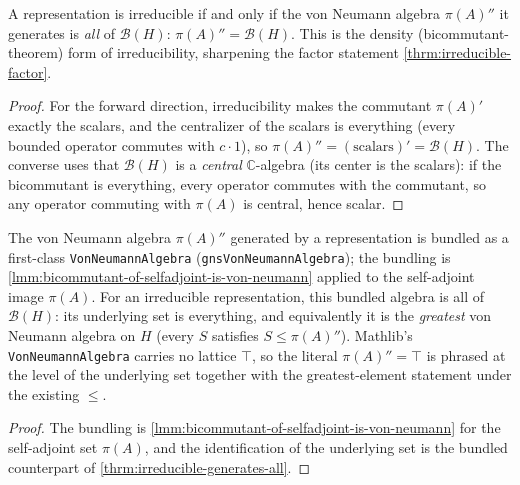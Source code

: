 \begin{theorem}
    \label{thrm:irreducible-generates-all}
    \leanok
    A representation is irreducible if and only if the von Neumann algebra $\pi(A)''$ it generates is \emph{all} of $\mathcal{B}(H)$: $\pi(A)'' = \mathcal{B}(H)$. This is the density (bicommutant-theorem) form of irreducibility, sharpening the factor statement \ref{thrm:irreducible-factor}.
\end{theorem}
\begin{proof}
    \leanok
    For the forward direction, irreducibility makes the commutant $\pi(A)'$ exactly the scalars, and the centralizer of the scalars is everything (every bounded operator commutes with $c \cdot 1$), so $\pi(A)'' = (\text{scalars})' = \mathcal{B}(H)$. The converse uses that $\mathcal{B}(H)$ is a \emph{central} $\mathbb{C}$-algebra (its center is the scalars): if the bicommutant is everything, every operator commutes with the commutant, so any operator commuting with $\pi(A)$ is central, hence scalar.
\end{proof}

\begin{theorem}
    \label{thrm:gns-generates-all-bundled}
    \leanok
    The von Neumann algebra $\pi(A)''$ generated by a representation is bundled as a first-class \texttt{VonNeumannAlgebra} (\texttt{gnsVonNeumannAlgebra}); the bundling is \ref{lmm:bicommutant-of-selfadjoint-is-von-neumann} applied to the self-adjoint image $\pi(A)$. For an irreducible representation, this bundled algebra is all of $\mathcal{B}(H)$: its underlying set is everything, and equivalently it is the \emph{greatest} von Neumann algebra on $H$ (every $S$ satisfies $S \le \pi(A)''$). Mathlib's \texttt{VonNeumannAlgebra} carries no lattice $\top$, so the literal $\pi(A)'' = \top$ is phrased at the level of the underlying set together with the greatest-element statement under the existing $\le$.
\end{theorem}
\begin{proof}
    \leanok
    The bundling is \ref{lmm:bicommutant-of-selfadjoint-is-von-neumann} for the self-adjoint set $\pi(A)$, and the identification of the underlying set is the bundled counterpart of \ref{thrm:irreducible-generates-all}.
\end{proof}

